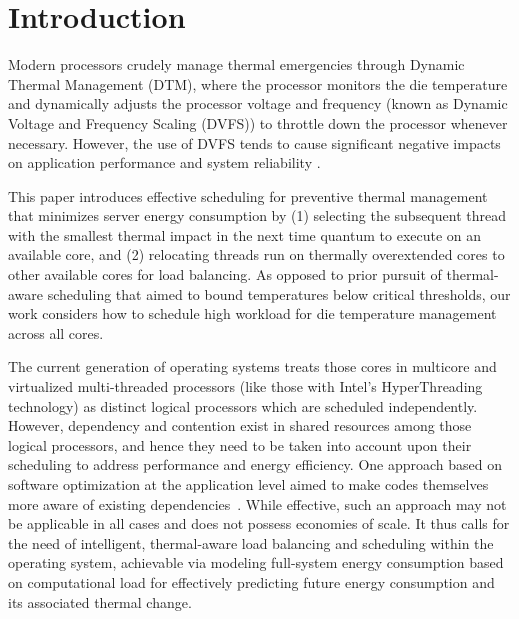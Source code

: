 \documentclass[times, 10pt,twocolumn]{IEEEtran}
\begin{document}
\section{Introduction}
\label{sec:Introduction}
Modern processors crudely manage thermal emergencies through Dynamic
Thermal Management (DTM), where the processor monitors the die
temperature and dynamically adjusts the processor voltage and frequency
(known as Dynamic Voltage and Frequency Scaling (DVFS))
to throttle down the processor whenever necessary. However, the use of
DVFS tends to cause significant negative impacts on application performance
and system reliability \cite{Donald2006,Bircher2008,Coskun2008d}.

This paper introduces effective scheduling for preventive thermal
management that minimizes server energy consumption by (1) 
selecting the subsequent thread with the smallest thermal impact
in the next time quantum to execute on an available core, and (2)
relocating threads run on thermally overextended cores
to other available cores for load balancing.
As opposed to prior pursuit of thermal-aware
scheduling \cite{Gomaa2004,Choi2007,Yang2008,Sarood2011} that 
aimed to bound temperatures below critical thresholds, our work considers
how to schedule high workload for die temperature management across all cores.

The current generation of operating systems treats those cores in 
multicore and virtualized multi-threaded processors (like those with Intel's HyperThreading technology) as distinct logical 
processors which are scheduled independently.
However, dependency and contention exist in shared resources 
among those logical processors, and hence they need to be taken into account upon their scheduling to address performance
and energy efficiency.
One approach based on software optimization at the application 
level aimed to make codes themselves more aware of existing
dependencies~\cite{Khan2011}.
While effective, such an approach may not be applicable in all 
cases and does not possess economies of scale.
It thus calls for the need of intelligent, thermal-aware load 
balancing and scheduling within the operating system,
achievable via modeling full-system energy consumption based on 
computational load for effectively predicting future energy 
consumption and its associated thermal change. 
\end{document}
